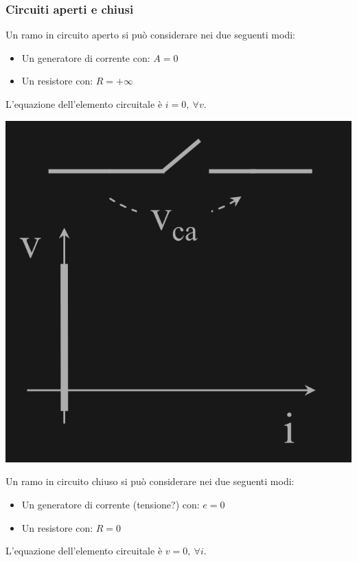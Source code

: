 \documentclass{article}
\begin{document}
\subsubsection{Circuiti aperti e chiusi}
Un ramo in circuito aperto si può
considerare nei due seguenti modi:
\begin{itemize}
    \item Un generatore di corrente con: $A = 0$
    \item Un resistore con: $R = + \infty$
\end{itemize}
L'equazione dell'elemento circuitale è $i=0, \ \forall v$.
\begin{center}
    \includegraphics[scale=0.23]{Image/Circuito aperto.png}
\end{center}
Un ramo in circuito chiuso si può
considerare nei due seguenti modi:
\begin{itemize}
    \item Un generatore di corrente (tensione?) con: $e = 0$
    \item Un resistore con: $R = 0$
\end{itemize}
L'equazione dell'elemento circuitale è $v=0, \ \forall i$.
\end{document}
